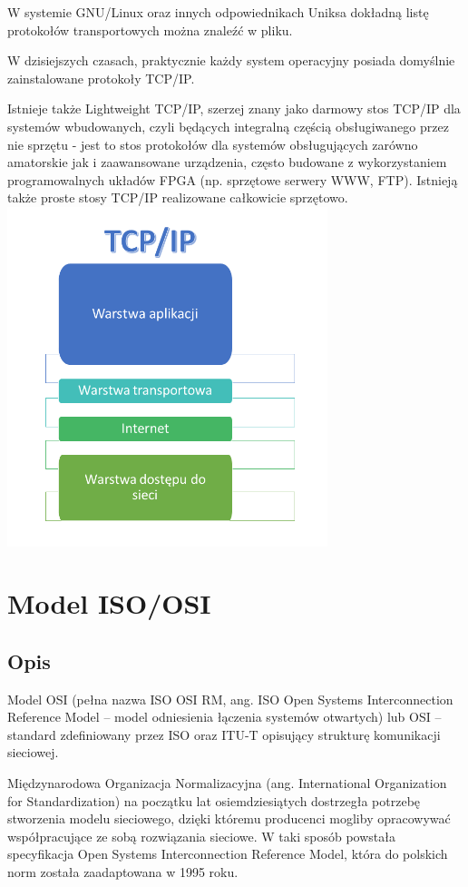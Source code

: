 \documentclass{article}
\begin{document}
W systemie GNU/Linux oraz innych odpowiednikach Uniksa dokładną listę protokołów transportowych można znaleźć w pliku.

W dzisiejszych czasach, praktycznie każdy system operacyjny posiada domyślnie zainstalowane protokoły TCP/IP.

Istnieje także Lightweight TCP/IP, szerzej znany jako darmowy stos TCP/IP dla systemów wbudowanych, czyli będących integralną częścią obsługiwanego przez nie sprzętu - jest to stos protokołów dla systemów obsługujących zarówno amatorskie jak i zaawansowane urządzenia, często budowane z wykorzystaniem programowalnych układów FPGA (np. sprzętowe serwery WWW, FTP). Istnieją także proste stosy TCP/IP realizowane całkowicie sprzętowo.
\includegraphics[width=0.7\textwidth]{tcp.png}

\section{Model ISO/OSI}
\subsection{Opis}
	Model OSI (pełna nazwa ISO OSI RM, ang. ISO Open Systems Interconnection Reference Model – model odniesienia łączenia systemów otwartych) lub OSI – standard zdefiniowany przez ISO oraz ITU-T opisujący strukturę komunikacji sieciowej.

Międzynarodowa Organizacja Normalizacyjna (ang. International Organization for Standardization) na początku lat osiemdziesiątych dostrzegła potrzebę stworzenia modelu sieciowego, dzięki któremu producenci mogliby opracowywać współpracujące ze sobą rozwiązania sieciowe. W taki sposób powstała specyfikacja Open Systems Interconnection Reference Model, która do polskich norm została zaadaptowana w 1995 roku.
\end{document}
